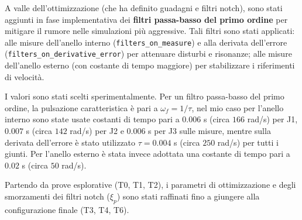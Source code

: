 \documentclass{article}
\begin{document}
A valle dell'ottimizzazione (che ha definito guadagni e filtri notch), sono stati aggiunti in fase implementativa dei 
\textbf{filtri passa-basso del primo ordine} per mitigare il rumore nelle simulazioni più aggressive. 
Tali filtri sono stati applicati: alle misure dell'anello interno (\texttt{filters\_on\_measure}) e alla derivata dell'errore 
(\texttt{filters\_on\_derivative\_error}) per attenuare disturbi e risonanze; alle misure dell'anello esterno (con costante di tempo maggiore)
 per stabilizzare i riferimenti di velocità.

I valori sono stati scelti sperimentalmente. Per un filtro passa-basso del primo ordine, la pulsazione caratteristica è pari a $\omega_f = 1/\tau$, nel mio caso per
l'anello interno sono state usate costanti di tempo pari a $0.006$ s (circa $166$ rad/s) per J1, 
$0.007$ s (circa $142$ rad/s) per J2 e $0.006$ s per J3 sulle misure, mentre sulla derivata dell'errore è stato utilizzato $\tau = 0.004$ s (circa $250$ rad/s) 
per tutti i giunti. Per l'anello esterno è stata invece adottata una costante di tempo pari a $0.02$ s (circa $50$ rad/s).

Partendo da prove esplorative (T0, T1, T2), i parametri di ottimizzazione e degli smorzamenti dei filtri notch ($\xi_p$) sono stati raffinati fino a giungere alla configurazione finale (T3, T4, T6).
\end{document}
